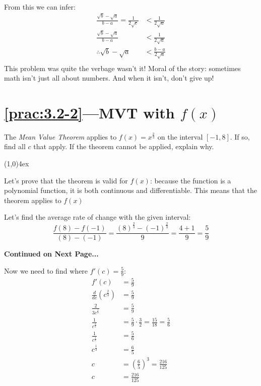 \documentclass{MathNotes}
\newcommand{\br}{
	\begin{center}
		\line(1,0){4ex}
	\end{center}}
\newcommand{\continued}{
	\mbox{}
	\vfill
	\textbf{Continued on Next Page...}\newpage
}
\begin{document}
From this we can infer:
\begin{align*}
	\frac{\sqrt{b}-\sqrt{a}}{b-a}=\frac{1}{2\sqrt{c}} & <\frac{1}{2\sqrt{a}}   \\
	\frac{\sqrt{b}-\sqrt{a}}{b-a}                     & <\frac{1}{2\sqrt{a}}   \\
	\therefore\sqrt{b}-\sqrt{a}                       & <\frac{b-a}{2\sqrt{a}} \\
\end{align*}
This problem was quite the verbage wasn't it! Moral of the story: sometimes
math isn't just all about numbers. And when it isn't, don't give up!

\section*{\ref{prac:3.2-2}---MVT with $f(x)$}\label{ans:3.2-2}
The \textit{Mean Value Theorem} applies to $f(x)=x^{\frac{2}{3}}$ on the
interval $[-1, 8]$. If so, find all $c$ that apply. If the theorem cannot
be applied, explain why.
\br
{}
Let's prove that the theorem is valid for $f(x)$: because the function is
a polynomial function, it is both continuous and differentiable. This means
that the theorem applies to $f(x)$

Let's find the average rate of change with the given interval:
\begin{displaymath}
	\frac{f(8)-f(-1)}{(8)-(-1)}=\frac{(8)^{\frac{2}{3}}-(-1)^{\frac{2}{3}}}{9}
	=\frac{4+1}{9}=\frac{5}{9}
\end{displaymath}
\continued
Now we need to find where $f'(c)=\frac{5}{9}$:
\begin{align*}
	f'(c)                       & =\frac{5}{9}                                           \\
	\frac{d}{dc}(c^\frac{2}{3}) & =\frac{5}{9}                                           \\
	\frac{2}{3c^{\frac{1}{3}}}  & =\frac{5}{9}                                           \\
	\frac{1}{c^{\frac{1}{3}}}   & =\frac{5}{9}\cdot\frac{3}{2}=\frac{15}{18}=\frac{5}{6} \\
	\frac{1}{c^{\frac{1}{3}}}   & =\frac{5}{6}                                           \\
	c^{\frac{1}{3}}             & =\frac{6}{5}                                           \\
	c                           & =(\frac{6}{5})^3=\frac{216}{125}                       \\
	c                           & =\frac{216}{125}                                       \\
\end{align*}
\end{document}
